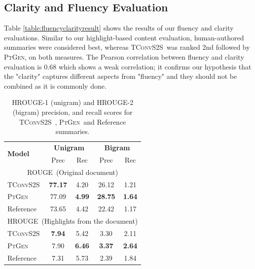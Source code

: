 \documentclass[11pt,a4paper]{article}
\newcommand\todo[1]{{\textcolor{red}{todo: #1}}}
\newcommand\ptgen{\textsc{PtGen}}
\newcommand\tconv{\textsc{TConvS2S}}
\newcommand\xsum{\textsc{XSum}}
\newcommand\hrouge{\textsc{HROUGE}}
\newcommand\rouge{\textsc{ROUGE}}
\begin{document}
\subsection{Clarity and Fluency Evaluation} 


Table \ref{table:fluencyclarityresult} shows the results of our 
fluency and clarity evaluations. Similar to our highlight-based content evaluation, human-authored summaries were considered best, whereas \tconv\  was  ranked  2nd  followed  by  \ptgen, on both measures. 
The Pearson correlation between fluency and clarity evaluation is 0.68 which shows a weak correlation; it confirms our hypothesis that the "clarity" captures different aspects from "fluency" and they should not be combined as it is commonly done. 

\begin{table}[t!]
\centering
\small
\begin{tabular}{l|cc|cc}
\hline
\multirow{2}{*}{\textbf{Model}} & \multicolumn{2}{c|}{\textbf{Unigram}} & \multicolumn{2}{c}{\textbf{Bigram}} \\
& Prec     & Rec  & Prec     & Rec     \\
\hline 
\multicolumn{5}{c}{\rouge\ (Original document)} \\
\hline
\tconv{}              & \textbf{77.17}    & 4.20    & 26.12    & 1.21    \\
\ptgen{}                  & 77.09    & \textbf{4.99}       & \textbf{28.75}    & \textbf{1.64}      \\
Reference              & 73.65    & 4.42    & 22.42    & 1.17      \\
\hline
\multicolumn{5}{c}{\hrouge\ (Highlights from the document)} \\
\hline
\tconv{}               &   \textbf{7.94}  &  5.42  & 3.30 &  2.11   \\
\ptgen{}                 & 7.90    & \textbf{6.46}      & \textbf{3.37}    & \textbf{2.64}     \\
Reference              &  7.31  & 5.73   &  2.39  & 1.84   \\
\hline
\end{tabular}
\caption{\hrouge-1 (unigram) and \hrouge-2 (bigram) precision, and recall scores for \tconv\ , \ptgen\  and Reference summaries.}
\label{table:rougeandhrougeresult}
\end{table}
\end{document}
